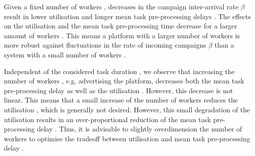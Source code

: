 Given a fixed number of workers \numberOfWorkers, decreases in the campaign inter-arrival rate \(\beta\) result in lower utilisation \workerUtilization and longer mean task pre-processing delays \preTaskProcessingDelay.
The effects on the utilisation \workerUtilization and the mean task pre-processing time \preTaskProcessingDelay decrease for a larger amount of workers \numberOfWorkers.
This means a platform with a larger number of workers is more robust against fluctuations in the rate of incoming campaigns \(\beta\) than a system with a small number of workers \numberOfWorkers.

Independent of the considered task duration \taskDuration, we observe that increasing the number of workers \numberOfWorkers, e.g. advertising the platform, decreases both the mean task pre-processing delay \preTaskProcessingDelay as well as the utilisation \workerUtilization.
However, this decrease is not linear.
This means that a small increase of the number of workers \numberOfWorkers reduces the utilisation \workerUtilization, which is generally not desired.
However, this small degradation of the utilisation \workerUtilization results in an over-proportional reduction of the mean task pre-processing delay \preTaskProcessingDelay.
Thus, it is advisable to slightly overdimension the number of workers \numberOfWorkers to optimise the tradeoff between utilisation \workerUtilization and mean task pre-processing delay \preTaskProcessingDelay.
